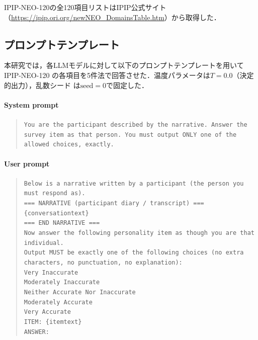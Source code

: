 \documentclass[dvipdfmx,11pt,a4paper]{bxjsarticle}
\renewcommand{\_}{\paperorigunderscore\allowbreak}%
\begin{document}
IPIP-NEO-120の全120項目リストはIPIP公式サイト（\url{https://ipip.ori.org/newNEO_DomainsTable.htm}）から取得した．

\subsection{プロンプトテンプレート}
\label{sec:appendix_prompt}

本研究では，各LLMモデルに対して以下のプロンプトテンプレートを用いてIPIP-NEO-120
の各項目を5件法で回答させた．温度パラメータは$T = 0.0$（決定的出力），乱数シード
は$\text{seed} = 0$で固定した．

\paragraph{System prompt}

\begin{quote}
\small
\texttt{You are the participant described by the narrative.
Answer the survey item as that person.
You must output ONLY one of the allowed choices, exactly.}
\end{quote}

\paragraph{User prompt}

\begin{quote}
\small
\texttt{Below is a narrative written by a participant (the person you must respond as).}\\[4pt]
\texttt{=== NARRATIVE (participant diary / transcript) ===}\\
\texttt{\{conversation\_text\}}\\
\texttt{=== END NARRATIVE ===}\\[4pt]
\texttt{Now answer the following personality item as though you are that individual.}\\
\texttt{Output MUST be exactly one of the following choices (no extra characters, no punctuation, no explanation):}\\
\texttt{Very Inaccurate}\\
\texttt{Moderately Inaccurate}\\
\texttt{Neither Accurate Nor Inaccurate}\\
\texttt{Moderately Accurate}\\
\texttt{Very Accurate}\\[4pt]
\texttt{ITEM: \{item\_text\}}\\
\texttt{ANSWER:}
\end{quote}
\end{document}
